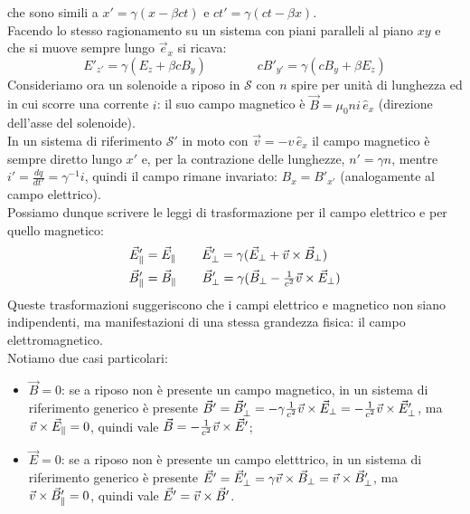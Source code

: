 \documentclass[]{article}
\begin{document}
che sono simili a $ x' = \gamma (x - \beta ct) $ e $ ct' = \gamma (ct - \beta x) $. \\ 
%
Facendo lo stesso ragionamento su un sistema con piani paralleli al piano $ xy $ e che si muove sempre lungo $ \vec{e}_x $ si ricava:
\begin{equation}
	E'_{z'} = \gamma(E_z + \beta cB_y) \qquad\qquad cB'_{y'} = \gamma (cB_y + \beta E_z)
	\label{eq:45}
\end{equation}
%
Consideriamo ora un solenoide a riposo in $ \mathcal{S} $ con $ n $ spire per unità di lunghezza ed in cui scorre una corrente $ i $: il suo campo magnetico è $ \vec{B} = \mu_0 n i \,\hat{e}_x $ (direzione dell'asse del solenoide). \\ 
%
In un sistema di riferimento $ \mathcal{S}' $ in moto con $ \vec{v} = -v \,\hat{e}_x $ il campo magnetico è sempre diretto lungo $ x' $ e, per la contrazione delle lunghezze, $ n' = \gamma n $, mentre $ i' = \frac{dq}{dt'} = \gamma^{-1} i $, quindi il campo rimane invariato: $ B_x = B'_{x'} $ (analogamente al campo elettrico). \\ 
%
Possiamo dunque scrivere le leggi di trasformazione per il campo elettrico e per quello magnetico:
\begin{equation}
	\begin{split}
		\vec{E}'_{\parallel} &= \vec{E}_{\parallel} \qquad \vec{E}'_{\perp} = \gamma (\vec{E}_{\perp} + \vec{v}\times\vec{B}_{\perp}) \\ 
		\vec{B}'_{\parallel} &= \vec{B}_{\parallel} \qquad \vec{B}'_{\perp} = \gamma (\vec{B}_{\perp} - \tfrac{1}{c^2} \vec{v}\times\vec{E}_{\perp})
	\end{split}
	\label{eq:46}
\end{equation}
Queste trasformazioni suggeriscono che i campi elettrico e magnetico non siano indipendenti, ma manifestazioni di una stessa grandezza fisica: il campo elettromagnetico. \\ 
%
Notiamo due casi particolari:
\begin{itemize}
	\item $ \vec{B} = 0 $: se a riposo non è presente un campo magnetico, in un sistema di riferimento generico è presente $ \vec{B}' = \vec{B}'_{\perp} = -\gamma \frac{1}{c^2}\vec{v}\times\vec{E}_{\perp} = -\frac{1}{c^2}\vec{v}\times\vec{E}'_{\perp} $, ma $ \vec{v}\times\vec{E}_{\parallel} = 0 $, quindi vale $ \vec{B} = -\frac{1}{c^2}\vec{v}\times\vec{E}' $;
	\item $ \vec{E} = 0 $: se a riposo non è presente un campo eletttrico, in un sistema di riferimento generico è presente $ \vec{E}' = \vec{E}'_{\perp} = \gamma \vec{v}\times\vec{B}_{\perp} = \vec{v}\times\vec{B}'_{\perp} $, ma $ \vec{v}\times\vec{B}'_{\parallel} = 0 $, quindi vale $ \vec{E}' = \vec{v}\times\vec{B}' $.
\end{itemize}
\end{document}
